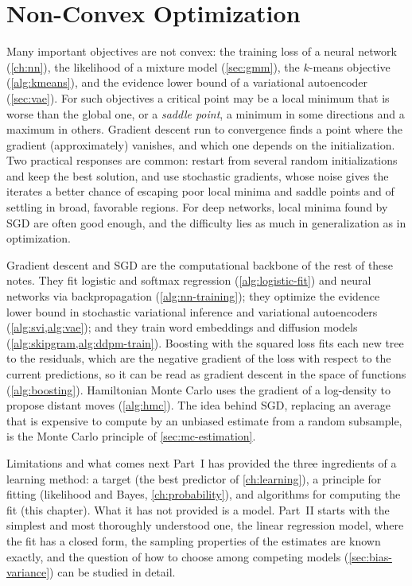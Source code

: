 \section{Non-Convex Optimization}\label{sec:nonconvex}

Many important objectives are not convex: the training loss of a neural network (\cref{ch:nn}), the likelihood of a mixture model (\cref{sec:gmm}), the $k$-means objective (\cref{alg:kmeans}), and the evidence lower bound of a variational autoencoder (\cref{sec:vae}). For such objectives a critical point may be a local minimum that is worse than the global one, or a \emph{saddle point}, a minimum in some directions and a maximum in others. Gradient descent run to convergence finds a point where the gradient (approximately) vanishes, and which one depends on the initialization. Two practical responses are common: restart from several random initializations and keep the best solution, and use stochastic gradients, whose noise gives the iterates a better chance of escaping poor local minima and saddle points and of settling in broad, favorable regions. For deep networks, local minima found by SGD are often good enough, and the difficulty lies as much in generalization as in optimization.

\begin{remark}\label{rem:sgd-everywhere}
Gradient descent and SGD are the computational backbone of the rest of these notes. They fit logistic and softmax regression (\cref{alg:logistic-fit}) and neural networks via backpropagation (\cref{alg:nn-training}); they optimize the evidence lower bound in stochastic variational inference and variational autoencoders (\cref{alg:svi,alg:vae}); and they train word embeddings and diffusion models (\cref{alg:skipgram,alg:ddpm-train}). Boosting with the squared loss fits each new tree to the residuals, which are the negative gradient of the loss with respect to the current predictions, so it can be read as gradient descent in the space of functions (\cref{alg:boosting}). Hamiltonian Monte Carlo uses the gradient of a log-density to propose distant moves (\cref{alg:hmc}). The idea behind SGD, replacing an average that is expensive to compute by an unbiased estimate from a random subsample, is the Monte Carlo principle of \cref{sec:mc-estimation}.
\end{remark}

\begin{notebox}{Limitations and what comes next}
Part~I has provided the three ingredients of a learning method: a target (the best predictor of \cref{ch:learning}), a principle for fitting (likelihood and Bayes, \cref{ch:probability}), and algorithms for computing the fit (this chapter). What it has not provided is a model. Part~II starts with the simplest and most thoroughly understood one, the linear regression model, where the fit has a closed form, the sampling properties of the estimates are known exactly, and the question of how to choose among competing models (\cref{sec:bias-variance}) can be studied in detail.
\end{notebox}

